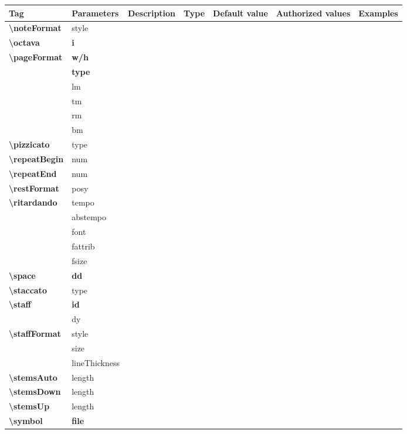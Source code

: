 \documentclass[a4paper, landscape, 10pt]{article}
\begin{document}
\begin{tabularx}{\linewidth}{p{3cm}p{2cm}p{5cm}p{3cm}p{3.5cm}p{3.5cm}p{4cm}}
    \hline
    \textbf{Tag}&\textbf{Parameters}&\textbf{Description}&\textbf{Type}&\textbf{Default value}&\textbf{Authorized values}&\textbf{Examples}\\
    \hline
    \textbf{\textbackslash{}noteFormat}&style&&&&&\\
    \hline
    \textbf{\textbackslash{}octava}&\textbf{i}&&&&&\\
    \hline
    \textbf{\textbackslash{}pageFormat}&\textbf{w/h}&&&&&\\
    &\textbf{type}&&&&&\\
    &lm&&&&&\\
    &tm&&&&&\\
    &rm&&&&&\\
    &bm&&&&&\\
    \hline
    \textbf{\textbackslash{}pizzicato}&type&&&&&\\
    \hline
    \textbf{\textbackslash{}repeatBegin}&num&&&&&\\
    \hline
    \textbf{\textbackslash{}repeatEnd}&num&&&&&\\
    \hline
    \textbf{\textbackslash{}restFormat}&posy&&&&&\\
    \hline
    \textbf{\textbackslash{}ritardando}&tempo&&&&&\\
    &abstempo&&&&&\\
    &font&&&&&\\
    &fattrib&&&&&\\
    &fsize&&&&&\\
    \hline
    \textbf{\textbackslash{}space}&\textbf{dd}&&&&&\\
    \hline
    \textbf{\textbackslash{}staccato}&type&&&&&\\
    \hline
    \textbf{\textbackslash{}staff}&\textbf{id}&&&&&\\
    &dy&&&&&\\
    \hline
    \textbf{\textbackslash{}staffFormat}&style&&&&&\\
    &size&&&&&\\
    &lineThickness&&&&&\\
    \hline
    \textbf{\textbackslash{}stemsAuto}&length&&&&&\\
    \hline
    \textbf{\textbackslash{}stemsDown}&length&&&&&\\
    \hline
    \textbf{\textbackslash{}stemsUp}&length&&&&&\\
    \hline
    \textbf{\textbackslash{}symbol}&\textbf{file}&&&&&\\

\end{tabularx}
\end{document}
